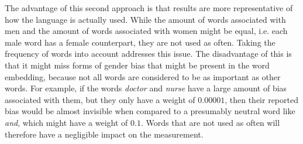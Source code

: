 The advantage of this second approach is that results are more representative of how
the language is actually used. While the amount of words associated with men and the
amount of words associated with women might be equal, i.e. each male word has a female
counterpart, they are not used as often.
Taking the frequency of words into account addresses this issue. 
The disadvantage of this is that
it might miss forms of gender bias that might be present in the word embedding, because
not all words are considered to be as important as other words. For example, if the words
\textit{doctor} and \textit{nurse} have a large amount of bias associated with them,
but they only have a weight of $0.00001$, then their reported bias would be almost
invisible when compared to a presumably neutral word like \textit{and}, which might have
a weight of $0.1$. Words that are not used as often will therefore have a negligible impact
on the measurement.

